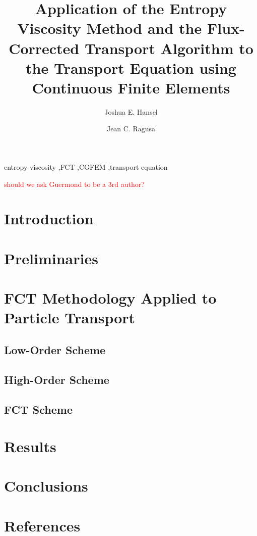 \documentclass{elsarticle}
\newcommand{\tcr}[1]{\textcolor{red}{#1}}
\begin{document}
\begin{frontmatter}


\title{Application of the Entropy Viscosity Method and the Flux-Corrected Transport
  Algorithm to the Transport Equation using Continuous Finite Elements}

\author[tamu]{Joshua E. Hansel}

\author[tamu]{Jean C. Ragusa}

\address[tamu]{Texas A\&M University,
  400 Bizzell St,
  College Station, TX 77840}



\begin{keyword}
entropy viscosity \sep FCT \sep CGFEM \sep transport equation
\end{keyword}

\end{frontmatter}
\tcr{should we ask Guermond to be a 3rd author?}

\section{Introduction\label{sec:introduction}}


\section{Preliminaries\label{sec:preliminaries}}


\section{FCT Methodology Applied to Particle Transport\label{sec:methodology}}

\subsection{Low-Order Scheme\label{sec:low}}

\subsection{High-Order Scheme\label{sec:high}}

\subsection{FCT Scheme\label{sec:fct}}


\section{Results\label{sec:results}}


\section{Conclusions\label{sec:conclusions}}


\section*{References}


\end{document}
